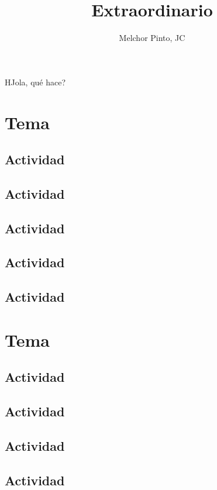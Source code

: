 \documentclass[12pt,examen]{repaso_layout}
\title{Extraordinario}
\author{Melchor Pinto, JC}
\begin{document}
    HJola, qué hace?
\begin{questions}
    \section{Tema}
    \subsection{Actividad}
    \subsection{Actividad}
    \subsection{Actividad}
    \subsection{Actividad}
    \subsection{Actividad}
        \section{Tema}
    \subsection{Actividad}
    \subsection{Actividad}
    \subsection{Actividad}
    \subsection{Actividad}

\end{questions}
\end{document}
